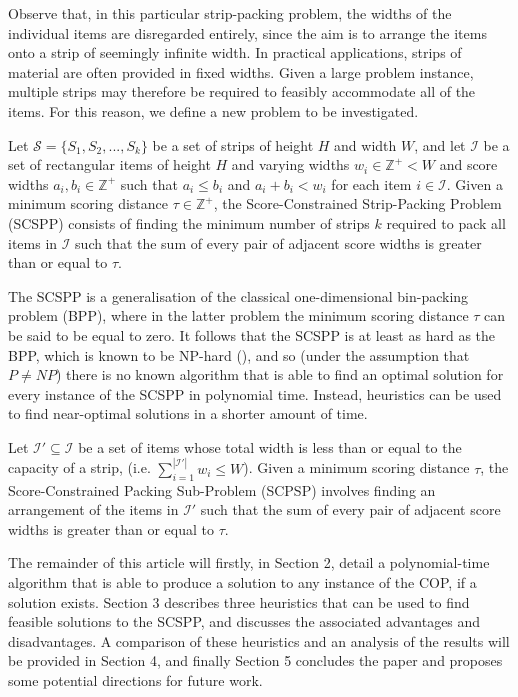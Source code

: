 \documentclass[oribibl]{llncs}
\begin{document}
Observe that, in this particular strip-packing problem, the widths of the individual items are disregarded entirely, since the aim is to arrange the items onto a strip of seemingly infinite width. In practical applications, strips of material are often provided in fixed widths. Given a large problem instance, multiple strips may therefore be required to feasibly accommodate all of the items. For this reason, we define a new problem to be investigated.

\begin{definition}
	\label{defn:scspp}
	Let $\mathcal{S} = \{S_1, S_2, ..., S_k\}$ be a set of strips of height $H$ and width $W$, and let $\mathcal{I}$ be a set of rectangular items of height $H$ and varying widths $w_i \in \mathbb{Z}^+ < W$ and score widths $a_i, b_i \in \mathbb{Z}^+$ such that $a_i \leq b_i$ and $a_i + b_i < w_i$ for each item $i \in \mathcal{I}$. Given a minimum scoring distance $\tau \in \mathbb{Z}^+$, the Score-Constrained Strip-Packing Problem (SCSPP) consists of finding the minimum number of strips $k$ required to pack all items in $\mathcal{I}$ such that the sum of every pair of adjacent score widths is greater than or equal to $\tau$.
\end{definition}

The SCSPP is a generalisation of the classical one-dimensional bin-packing problem (BPP), where in the latter problem the minimum scoring distance $\tau$ can be said to be equal to zero. It follows that the SCSPP is at least as hard as the BPP, which is known to be NP-hard (\citealp{garey1979}), and so (under the assumption that $P \neq NP$) there is no known algorithm that is able to find an optimal solution for every instance of the SCSPP in polynomial time. Instead, heuristics can be used to find near-optimal solutions in a shorter amount of time.

\begin{definition}
	\label{defn:subprob}
	Let $\mathcal{I}' \subseteq \mathcal{I}$ be a set of items whose total width is less than or equal to the capacity of a strip, (i.e. $\sum_{i=1}^{|\mathcal{I}'|}w_i \leq W$). Given a minimum scoring distance $\tau$, the Score-Constrained Packing Sub-Problem (SCPSP) involves finding an arrangement of the items in $\mathcal{I}'$ such that the sum of every pair of adjacent score widths is greater than or equal to $\tau$.
\end{definition}

The remainder of this article will firstly, in Section 2, detail a polynomial-time algorithm that is able to produce a solution to any instance of the COP, if a solution exists. Section 3 describes three heuristics that can be used to find feasible solutions to the SCSPP, and discusses the associated advantages and disadvantages. A comparison of these heuristics and an analysis of the results will be provided in Section 4, and finally Section 5 concludes the paper and proposes some potential directions for future work.
\end{document}
